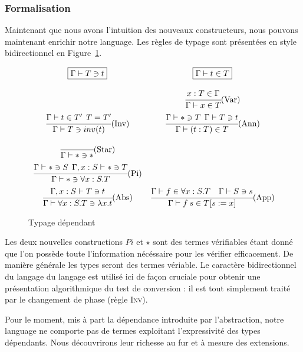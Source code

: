 \documentclass {article}
\theoremstyle{definition}
\theoremstyle{remark}
\begin{document}
\subsubsection{Formalisation}

Maintenant que nous avons l'intuition des nouveaux constructeurs, nous pouvons maintenant enrichir notre language.
Les règles de typage sont présentées en style bidirectionnel en Figure~\ref{fig:typage dependant}.

\begin{figure}
  \[
  \begin{array}{cc}
  \boxed{\Gamma\vdash T \ni t}
  &
  \boxed{\Gamma\vdash t \in T}
  \bigskip
  \\ 
  &
  \cfrac{x:T \in \Gamma}
        {\Gamma \vdash x \in T }\mbox{(Var)}
  \medskip
  \\
  \cfrac{\Gamma \vdash t \in T' \:\: T=T'}
        {\Gamma\vdash T \ni inv(t)}\mbox{(Inv)}
  &
  \cfrac{\Gamma\vdash * \ni T \:\:\Gamma\vdash T \ni t}
        {\Gamma\vdash (t:T) \in T}\mbox{(Ann)}
  \medskip
  \\
  \cfrac{}
        {\Gamma \vdash * \ni *}\mbox{(Star)} 
  \medskip
  \\
  \cfrac{\Gamma \vdash * \ni S\:\:\Gamma,x:S \vdash *\ni T}
        {\Gamma\vdash * \ni \forall x:S.T}\mbox{(Pi)}
  \medskip
  \\
  \cfrac{\Gamma,x:S\vdash T \ni t}
        {\Gamma \vdash \forall x:S.T \ni \lambda x. t}\mbox{(Abs)} 
  & 
  \cfrac{\Gamma \vdash f \in \forall x:S.T \quad \Gamma\vdash S \ni s }
        {\Gamma\vdash f\:s\in \subst{T}{s}{x}}\mbox{(App)} 
  \end{array}
  \]
  
  \caption{Typage dépendant}
  \label{fig:typage dependant} 
\end{figure}

Les deux nouvelles constructions $Pi$ et
$\star$ sont des termes vérifiables étant donné que l'on possède
toute l'information nécéssaire pour les vérifier efficacement. De
manière générale les types seront des termes vériable.  Le caractère
bidirectionnel du langage du langage est utilisé ici de façon cruciale
pour obtenir une présentation algorithmique du test de conversion : il
est tout simplement traité par le changement de phase (règle
\textsc{Inv}).

Pour le moment, mis à part la dépendance introduite par l'abstraction, notre language ne comporte pas de termes exploitant 
l'expressivité des types dépendants. Nous découvrirons leur richesse au fur et à mesure des extensions.
\end{document}
